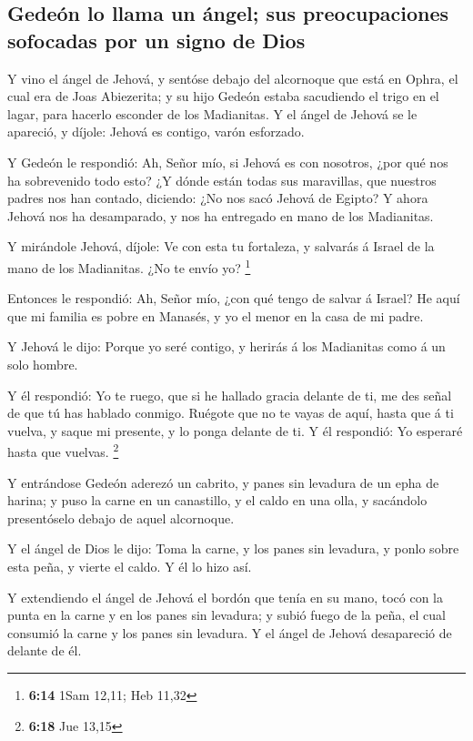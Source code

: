 \hypertarget{gedeuxf3n-lo-llama-un-uxe1ngel-sus-preocupaciones-sofocadas-por-un-signo-de-dios}{%
\subsection{Gedeón lo llama un ángel; sus preocupaciones sofocadas por
un signo de
Dios}\label{gedeuxf3n-lo-llama-un-uxe1ngel-sus-preocupaciones-sofocadas-por-un-signo-de-dios}}

 Y vino el ángel de Jehová, y sentóse debajo del alcornoque
que está en Ophra, el cual era de Joas Abiezerita; y su hijo Gedeón
estaba sacudiendo el trigo en el lagar, para hacerlo esconder de los
Madianitas.  Y el ángel de Jehová se le apareció, y díjole:
Jehová es contigo, varón esforzado.

 Y Gedeón le respondió: Ah, Señor mío, si Jehová es con
nosotros, ¿por qué nos ha sobrevenido todo esto? ¿Y dónde están todas
sus maravillas, que nuestros padres nos han contado, diciendo: ¿No nos
sacó Jehová de Egipto? Y ahora Jehová nos ha desamparado, y nos ha
entregado en mano de los Madianitas.

 Y mirándole Jehová, díjole: Ve con esta tu fortaleza, y
salvarás á Israel de la mano de los Madianitas. ¿No te envío yo?
\footnote{\textbf{6:14} 1Sam 12,11; Heb 11,32}

 Entonces le respondió: Ah, Señor mío, ¿con qué tengo de
salvar á Israel? He aquí que mi familia es pobre en Manasés, y yo el
menor en la casa de mi padre.

 Y Jehová le dijo: Porque yo seré contigo, y herirás á los
Madianitas como á un solo hombre.

 Y él respondió: Yo te ruego, que si he hallado gracia
delante de ti, me des señal de que tú has hablado conmigo. 
Ruégote que no te vayas de aquí, hasta que á ti vuelva, y saque mi
presente, y lo ponga delante de ti. Y él respondió: Yo esperaré hasta
que vuelvas. \footnote{\textbf{6:18} Jue 13,15}

 Y entrándose Gedeón aderezó un cabrito, y panes sin
levadura de un epha de harina; y puso la carne en un canastillo, y el
caldo en una olla, y sacándolo presentóselo debajo de aquel alcornoque.

 Y el ángel de Dios le dijo: Toma la carne, y los panes sin
levadura, y ponlo sobre esta peña, y vierte el caldo. Y él lo hizo así.

 Y extendiendo el ángel de Jehová el bordón que tenía en su
mano, tocó con la punta en la carne y en los panes sin levadura; y subió
fuego de la peña, el cual consumió la carne y los panes sin levadura. Y
el ángel de Jehová desapareció de delante de él.

